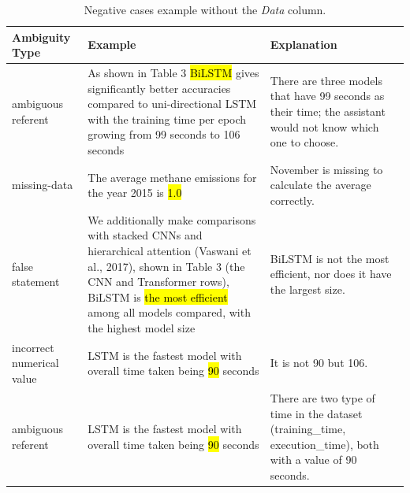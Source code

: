 \begin{table}[t]
    \centering
    \small
    \begin{tabular}{p{3cm} p{6cm} p{4cm}}
        \toprule
        \textbf{Ambiguity Type} & \textbf{Example} & \textbf{Explanation} \\
        \midrule

        ambiguous referent &
        As shown in Table 3 \hl{BiLSTM} gives significantly better accuracies compared to uni-directional LSTM with the training time per epoch growing from 99 seconds to 106 seconds &
        There are three models that have 99 seconds as their time; the assistant would not know which one to choose. \\

        \midrule
        missing-data &
        The average methane emissions for the year 2015 is \hl{1.0} &
        November is missing to calculate the average correctly. \\

        \midrule
        false statement &
        We additionally make comparisons with stacked CNNs and hierarchical attention (Vaswani et al., 2017), shown in Table 3 (the CNN and Transformer rows), BiLSTM is \hl{the most efficient} among all models compared, with the highest model size &
        BiLSTM is not the most efficient, nor does it have the largest size. \\

        \midrule
        incorrect numerical value &
        LSTM is the fastest model with overall time taken being \hl{90} seconds &
        It is not 90 but 106. \\

        \midrule
        ambiguous referent &
        LSTM is the fastest model with overall time taken being \hl{90} seconds &
        There are two type of time in the dataset (training\_time, execution\_time), both with a value of 90 seconds. \\

        \bottomrule
    \end{tabular}
    \caption{Negative cases example without the \emph{Data} column.}
    \label{tab:ambiguita}
\end{table}






